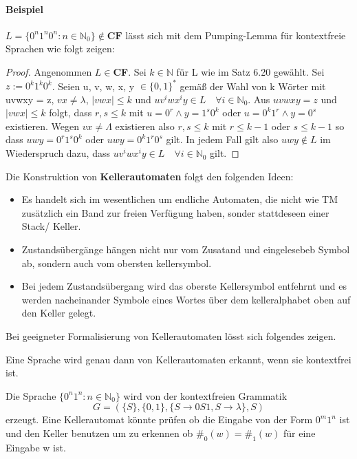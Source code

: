 \paragraph{Beispiel}
    \(L = \{0^n 1^n 0^n : n\in \mathbb{N}_0\} \not \in \textbf{CF}\) lässt sich mit dem Pumping-Lemma für kontextfreie Sprachen wie folgt zeigen:
    \begin{proof}
        Angenommen \(L \in \)\textbf{CF}. Sei \(k \in \mathbb{N}\) für L wie im Satz 6.20 gewählt. Sei \(z:=0^k1^k0^k\). Seien u, v, w, x, y \(\in \{0, 1\}^*\) gemäß der Wahl von k Wörter mit uvwxy = z, \(vx \not = \lambda\), \(|vwx| \leq k\) und \(uv^iwx^iy \in L \quad \forall i \in \mathbb{N}_0\). Aus \(uvwxy = z\) und \(|vwx| \leq k\) folgt, dass \(r, s \leq k\) mit \(u = 0^r \wedge y = 1^s0^k\) oder \(u = 0^k 1^r \wedge y = 0^s\) existieren. Wegen \(vx \not = \Lambda\) existieren also \(r, s \leq k\) mit \(r \leq k - 1\) oder \(s \leq k -1\) so dass \(uwy = 0^r1^s0^k\) oder \(uwy = 0^k1^r0^s\) gilt. In jedem Fall gilt also \(uwy \not \in L\) im Wiederspruch dazu, dass \(uv^iwx^iy \in L \quad \forall i \in \mathbb{N}_0\) gilt.
    \end{proof}

Die Konstruktion von \textbf{Kellerautomaten} folgt den folgenden Ideen:
\begin{itemize}
    \item Es handelt sich im wesentlichen um endliche Automaten, die nicht wie TM zusätzlich ein Band zur freien Verfügung haben, sonder stattdeseen einer Stack/ Keller.
    \item Zustandsübergänge hängen nicht nur vom Zusatand und eingelesebeb Symbol ab, sondern auch vom obersten kellersymbol.
    \item Bei jedem Zustandsübergang wird das oberste Kellersymbol entfehrnt und es werden nacheinander Symbole eines Wortes über dem kelleralphabet oben auf den Keller gelegt.
\end{itemize}
Bei geeigneter Formalisierung von Kellerautomaten lösst sich folgendes zeigen.

    Eine Sprache wird genau dann von Kellerautomaten erkannt, wenn sie kontextfrei ist.

    Die Sprache \(\{0^n1^n : n\in \mathbb{N}_0\}\) wird von der kontextfreien Grammatik 
    \[
        G = (\{S\}, \{0, 1\}, \{S \to 0S1, S \to \lambda\}, S)
    \] 
    erzeugt. Eine Kellerautomat könnte prüfen ob die Eingabe von der Form \(0^m 1^n\) ist und den Keller benutzen um zu erkennen ob \(\#_0(w) = \#_1(w)\) für eine Eingabe w ist.
    
